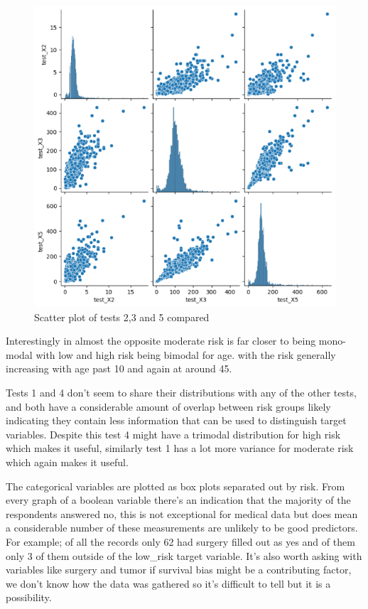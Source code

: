 \documentclass[a4paper]{article}
\begin{document}
\begin{figure}[h]
    \centering
    \includegraphics[width=0.75\linewidth]{scatter_pair_2_3_5.png}
    \caption{Scatter plot of tests 2,3 and 5 compared}
    \label{fig:235 scatter}
\end{figure}

Interestingly in almost the opposite moderate risk is far closer to being mono-modal with low and high risk being bimodal for age. with the risk generally increasing with age past 10 and again at around 45.

Tests 1 and 4 don't seem to share their distributions with any of the other tests, and both have a considerable amount of overlap between risk groups likely indicating they contain less information that can be used to distinguish target variables. Despite this test 4 might have a trimodal distribution for high risk which makes it useful, similarly test 1 has a lot more variance for moderate risk which again makes it useful.

The categorical variables are plotted as box plots separated out by risk. From every graph of a boolean variable there's an indication that the majority of the respondents answered no, this is not exceptional for medical data but does mean a considerable number of these measurements are unlikely to be good predictors. 
For example; 
of all the records only 62 had surgery filled out as yes and of them only 3 of them outside of the low\_risk target variable. It's also worth asking with variables like surgery and tumor if survival bias might be a contributing factor, we don't know how the data was gathered so it's difficult to tell but it is a possibility. 
\end{document}

